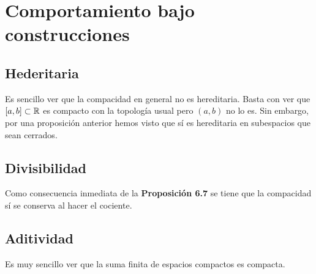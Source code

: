 \section{Comportamiento bajo construcciones}
\subsection*{Hederitaria}
Es sencillo ver que la compacidad en general no es hereditaria. Basta con ver que $\displaystyle \left[a,b\right] \subset \mathbb{R} $ es compacto con la topología usual pero $\displaystyle \left(a,b\right) $ no lo es. Sin embargo, por una proposición anterior hemos visto que sí es hereditaria en subespacios que sean cerrados. 
\subsection*{Divisibilidad}
Como consecuencia inmediata de la \textbf{Proposición 6.7} se tiene que la compacidad sí se conserva al hacer el cociente. 
\subsection*{Aditividad}
Es muy sencillo ver que la suma finita de espacios compactos es compacta. 
